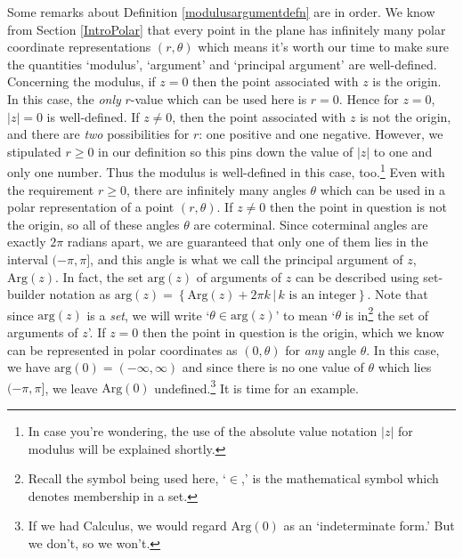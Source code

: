 Some remarks about  Definition \ref{modulusargumentdefn} are in order.  We know from Section \ref{IntroPolar} that every point in the plane has infinitely many polar coordinate representations $(r,\theta)$ which means it's worth our time to make sure the quantities `modulus', `argument' and `principal argument' are well-defined. Concerning the modulus, if $z = 0$ then the point associated with $z$ is the origin. In this case, the \textit{only} $r$-value which can be used here is $r=0$.  Hence for $z= 0$, $|z| = 0$ is well-defined. If $z \neq 0$, then the point associated with $z$ is not the origin, and there are \textit{two} possibilities for $r$:  one positive and one negative.  However, we stipulated $r \geq 0$ in our definition so this pins down the value of $|z|$ to one and only one number. Thus the modulus is well-defined in this case, too.\footnote{In case you're wondering, the use of the absolute value notation $|z|$ for modulus will be explained shortly.} Even with the requirement $r \geq 0$,  there are infinitely many angles $\theta$ which can be used in a polar representation of a point $(r,\theta)$. If $z \neq 0$ then the point in question is not the origin, so all of these angles $\theta$ are coterminal.  Since coterminal angles are exactly $2\pi$ radians apart, we are guaranteed that only one of them lies in the interval $(-\pi, \pi]$, and this angle is what we call the principal argument of $z$, $\text{Arg}(z)$. In fact, the set $\text{arg}(z)$ of  arguments of $z$ can be described using set-builder notation as  $\text{arg}(z) = \left\{ \text{Arg}(z) + 2\pi k \, | \, \text{$k$ is an integer} \right\}$.  Note that since $\text{arg}(z)$ is a \textit{set}, we will write `$\theta \in \text{arg}(z)$' to mean `$\theta$ is in\footnote{Recall the symbol being used here, `$\in$,' is the mathematical symbol which denotes membership in a set.}  the set of arguments of $z$'.   If $z=0$ then the point in question is the origin, which we know can be represented in polar coordinates as $(0,\theta)$ for \textit{any} angle $\theta$. In this case, we have $\text{arg}(0) = (-\infty, \infty)$ and since there is no one value of $\theta$ which lies $(-\pi, \pi]$, we leave $\text{Arg}(0)$ undefined.\footnote{If we had Calculus, we would regard $\text{Arg}(0)$ as an `indeterminate form.'  But we don't, so we won't.} It is time for an example.



